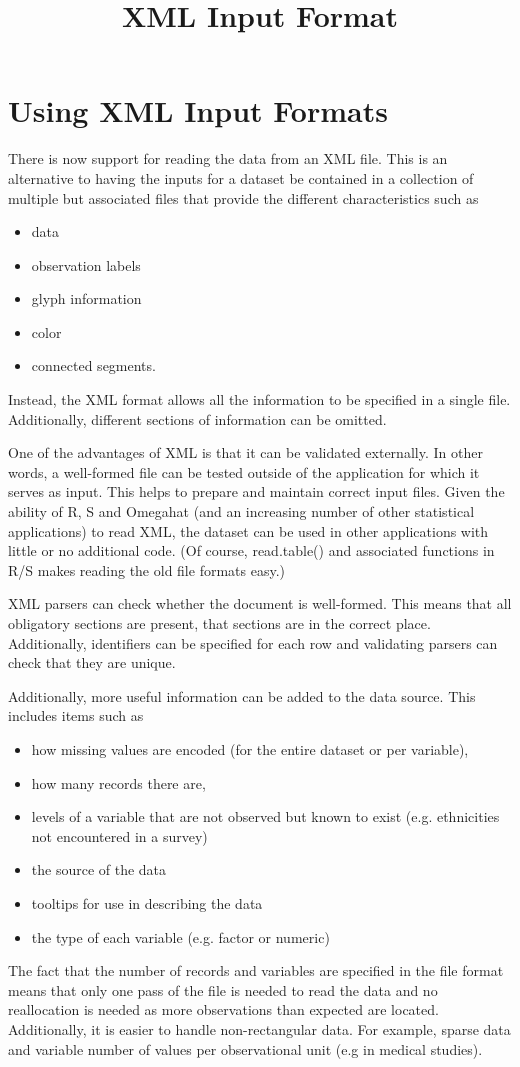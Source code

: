 \documentclass{article}
\title{XML Input Format}
\begin{document}
\section{Using XML Input Formats}
There is now support for reading the data from an XML
file.
This is an alternative to having the inputs
for a dataset be contained in a collection of multiple but associated files
that provide the different characteristics such as 
\begin{itemize}
\item data
\item observation labels
\item glyph information
\item color
\item connected segments.
\end{itemize}
Instead, the XML format allows all the information to be specified in
a single file.  Additionally, different sections of information can be
omitted.


One of the advantages of XML is that it can be validated externally.
In other words, a well-formed file can be tested outside of the
application for which it serves as input.  This helps to prepare and
maintain correct input files.  Given the ability of R, S and Omegahat
(and an increasing number of other statistical applications) to read
XML, the dataset can be used in other applications with little or no
additional code.  (Of course, read.table() and associated functions in
R/S makes reading the old file formats easy.)

XML parsers can check whether the document is well-formed.  This means
that all obligatory sections are present, that sections are in the
correct place.  Additionally, identifiers can be specified for each
row and validating parsers can check that they are unique.

Additionally, more useful information can be added
to the data source.
This includes items such as 
\begin{itemize}
\item how missing values
are encoded (for the entire dataset or per variable),
\item how many records there are, 
\item levels of a variable that are not observed
but known to exist (e.g. ethnicities not encountered in a survey)
\item the source of the data
\item tooltips for use in describing the data
\item the type of each variable (e.g. factor or numeric)
\end{itemize}
The fact that the number of records and variables are specified in the
file format means that only one pass of the file is needed to read the
data and no reallocation is needed as more observations than expected
are located.  Additionally, it is easier to handle non-rectangular
data.  For example, sparse data and variable number of values per
observational unit (e.g in medical studies).
\end{document}
